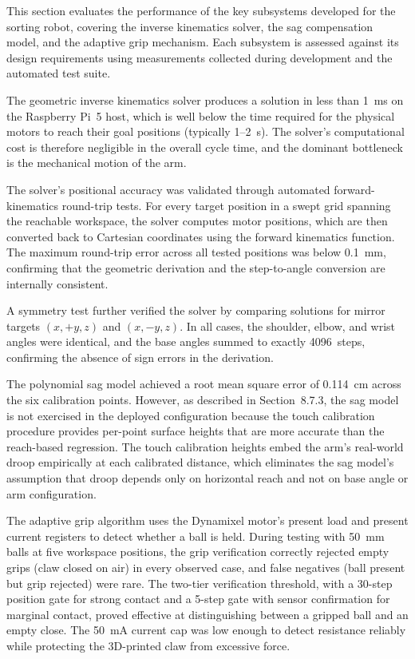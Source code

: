 
This section evaluates the performance of the key subsystems
developed for the sorting robot, covering the inverse kinematics
solver, the sag compensation model, and the adaptive grip
mechanism. Each subsystem is assessed against its design
requirements using measurements collected during development and
the automated test suite.


The geometric inverse kinematics solver produces a solution in
less than 1~ms on the Raspberry Pi~5 host, which is well below
the time required for the physical motors to reach their goal
positions (typically 1--2~s). The solver's computational cost is
therefore negligible in the overall cycle time, and the dominant
bottleneck is the mechanical motion of the arm.

The solver's positional accuracy was validated through automated
forward-kinematics round-trip tests. For every target position
in a swept grid spanning the reachable workspace, the solver
computes motor positions, which are then converted back to
Cartesian coordinates using the forward kinematics function.
The maximum round-trip error across all tested positions was
below 0.1~mm, confirming that the geometric derivation and the
step-to-angle conversion are internally consistent.

A symmetry test further verified the solver by comparing
solutions for mirror targets $(x, +y, z)$ and $(x, -y, z)$.
In all cases, the shoulder, elbow, and wrist angles were
identical, and the base angles summed to exactly 4096~steps,
confirming the absence of sign errors in the derivation.


The polynomial sag model achieved a root mean square error of
0.114~cm across the six calibration points. However, as
described in Section~8.7.3, the sag model is not exercised in
the deployed configuration because the touch calibration
procedure provides per-point surface heights that are more
accurate than the reach-based regression. The touch calibration
heights embed the arm's real-world droop empirically at each
calibrated distance, which eliminates the sag model's
assumption that droop depends only on horizontal reach and not
on base angle or arm configuration.


The adaptive grip algorithm uses the Dynamixel motor's present
load and present current registers to detect whether a ball is
held. During testing with 50~mm balls at five workspace
positions, the grip verification correctly rejected empty grips
(claw closed on air) in every observed case, and false
negatives (ball present but grip rejected) were rare. The
two-tier verification threshold, with a 30-step position gate
for strong contact and a 5-step gate with sensor confirmation
for marginal contact, proved effective at distinguishing
between a gripped ball and an empty close. The 50~mA current
cap was low enough to detect resistance reliably while
protecting the 3D-printed claw from excessive force.
